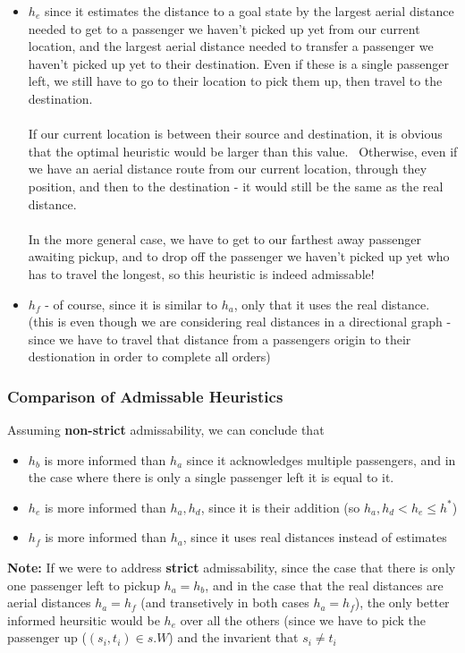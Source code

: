 \documentclass{article}
\begin{document}
\begin{itemize}
\item $h_e$ since it estimates the distance to a goal state by the largest aerial distance needed to get to a passenger we haven't picked up yet from our current location, and the largest aerial distance needed to transfer a passenger we haven't picked up yet to their destination. Even if these is a single passenger left, we still have to go to their  location to pick them up, then travel to the destination. \\~\\
If our current location is between their source and destination, it is obvious that the optimal heuristic would be larger than this value. \ 
Otherwise, even if we have an aerial distance route from our current location, through they position, and then to the destination - it would still be the same as the real distance. \\~\\
In the more general case, we have to get to our farthest away passenger awaiting pickup, and to drop off the passenger we haven't picked up yet who has to travel the longest, so this heuristic is indeed admissable!

\item $h_f$ - of course, since it is similar to $h_a$, only that it uses the real distance. (this is even though we are considering real distances in a directional graph - since we have to travel that distance from a passengers origin to their destionation in order to complete all orders)

\end{itemize}

\subsubsection*{Comparison of Admissable Heuristics}
Assuming \textbf{non-strict} admissability, we can conclude that
\begin{itemize}
	\item $h_b$ is more informed than $h_a$ since it acknowledges multiple passengers, and in the case where there is only a single passenger left it is equal to it.
	\item $h_e$ is more informed than $h_a, h_d$, since it is their addition (so $h_a, h_d < h_e \leq h^*$)
	\item $h_f$ is more informed than $h_a$, since it uses real distances instead of estimates
\end{itemize}

\textbf{Note:} If we were to address \textbf{strict} admissability, since the case that there is only one passenger left to pickup $h_a = h_b$, and in the case that the real distances are aerial distances $h_a = h_f$ (and transetively in both cases $h_a = h_f$), the only better informed heursitic would be $h_e$ over all the others (since we have to pick the passenger up ($(s_i,  t_i) \in s.W$) and the invarient that $s_i \neq t_i$
\end{document}
